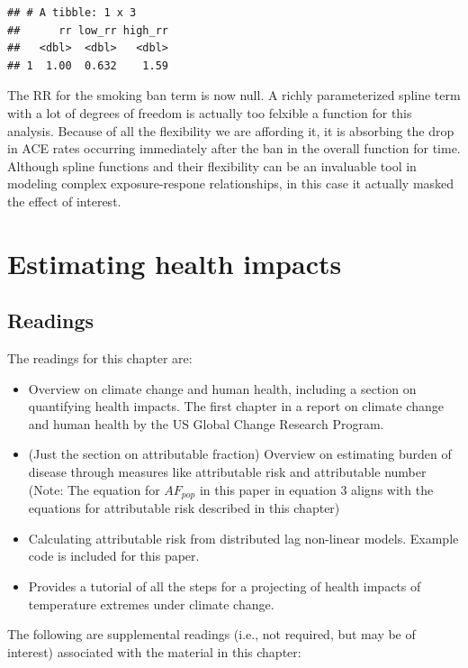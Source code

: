 \documentclass[
]{book}
\providecommand{\tightlist}{%
  \setlength{\itemsep}{0pt}\setlength{\parskip}{0pt}}
\begin{document}
\begin{verbatim}
## # A tibble: 1 x 3
##      rr low_rr high_rr
##   <dbl>  <dbl>   <dbl>
## 1  1.00  0.632    1.59
\end{verbatim}

The RR for the smoking ban term is now null. A richly parameterized spline term with a lot of degrees of freedom is actually too felxible a function for this analysis. Because of all the flexibility we are affording it, it is absorbing the drop in ACE rates occurring immediately after the ban in the overall function for time. Although spline functions and their flexibility can be an invaluable tool in modeling complex exposure-respone relationships, in this case it actually masked the effect of interest.

\chapter{Estimating health impacts}\label{estimating-health-impacts}

\section{Readings}\label{readings-3}

The readings for this chapter are:

\begin{itemize}
\tightlist
\item
  \citet{balbus2016climate} Overview on climate change and human health, including a section on quantifying health impacts. The first chapter in a report on climate change and human health by the US Global Change Research Program.
\item
  \citet{steenland2006overview} (Just the section on attributable fraction) Overview on estimating burden of disease through measures like attributable risk and attributable number (Note: The equation for \(AF_{pop}\) in this paper in equation 3 aligns with the equations for attributable risk described in this chapter)
\item
  \citet{gasparrini2014attributable} Calculating attributable risk from distributed lag non-linear models. Example code is included for this paper.
\item
  \citet{vicedo2019hands} Provides a tutorial of all the steps for a
  projecting of health impacts of temperature extremes under climate change.
\end{itemize}

The following are supplemental readings (i.e., not required, but may be of
interest) associated with the material in this chapter:
\end{document}
